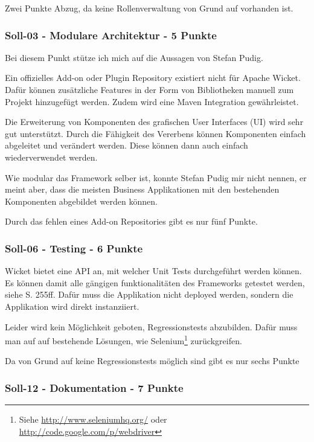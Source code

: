   \noindent
  Zwei Punkte Abzug, da keine Rollenverwaltung von Grund auf vorhanden ist.
  
  \subsubsection{Soll-03 - Modulare Architektur - 5 Punkte}
  
  Bei diesem Punkt stütze ich mich auf die Aussagen von Stefan Pudig.
  
  Ein offizielles Add-on oder Plugin Repository existiert nicht für Apache
  Wicket. Dafür können zusätzliche Features in der Form von Bibliotheken manuell
  zum Projekt hinzugefügt werden. Zudem wird eine Maven Integration
  gewährleistet.
  
  Die Erweiterung von Komponenten des grafischen User Interfaces (UI) wird sehr
  gut unterstützt. Durch die Fähigkeit des Vererbens können Komponenten einfach
  abgeleitet und verändert werden. Diese können dann auch einfach
  wiederverwendet werden.
  
  Wie modular das Framework selber ist, konnte Stefan Pudig mir nicht nennen, er
  meint aber, dass die meisten Business Applikationen mit den bestehenden
  Komponenten abgebildet werden können.
  
  Durch das fehlen eines Add-on Repositories gibt es nur fünf Punkte.
  
  \subsubsection{Soll-06 - Testing - 6 Punkte}
  
  Wicket bietet eine \ac{API} an, mit welcher Unit Tests durchgeführt werden
  können. Es können damit alle gängigen funktionalitäten des Frameworks
  getestet werden, siehe \cite{Wicket} S. 255ff. Dafür muss die Applikation
  nicht deployed werden, sondern die Applikation wird direkt instanziiert.
  
  Leider wird kein Möglichkeit geboten, Regressionstests abzubilden. Dafür muss
  man auf auf bestehende Lösungen, wie
  Selenium\footnote{Siehe \url{http://www.seleniumhq.org/} oder
  \url{http://code.google.com/p/webdriver}} zurückgreifen.
  
  Da von Grund auf keine Regressionstests möglich sind gibt es nur sechs Punkte
  
  \subsubsection{Soll-12 - Dokumentation - 7 Punkte}

